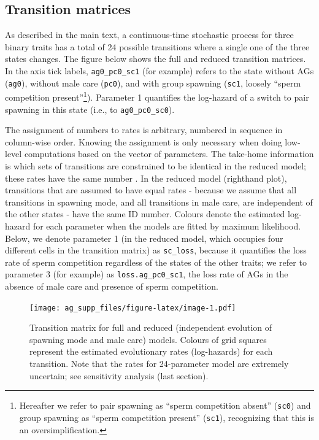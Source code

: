 \documentclass[
]{article}
\begin{document}
\hypertarget{transition-matrices}{%
\subsection{Transition matrices}\label{transition-matrices}}

As described in the main text, a continuous-time stochastic process for
three binary traits has a total of 24 possible transitions where a
single one of the three states changes. The figure below shows the full
and reduced transition matrices. In the axis tick labels,
\texttt{ag0\_pc0\_sc1} (for example) refers to the state without AGs
(\texttt{ag0}), without male care (\texttt{pc0}), and with group
spawning (\texttt{sc1}, loosely ``sperm competition
present''\footnote{Hereafter we refer to pair spawning as ``sperm
  competition absent'' (\texttt{sc0}) and group spawning as ``sperm
  competition present'' (\texttt{sc1}), recognizing that this is an
  oversimplification.}). Parameter 1 quantifies the log-hazard of a
switch to pair spawning in this state (i.e., to \texttt{ag0\_pc0\_sc0}).

The assignment of numbers to rates is arbitrary, numbered in sequence in
column-wise order. Knowing the assignment is only necessary when doing
low-level computations based on the vector of parameters. The take-home
information is which sets of transitions are constrained to be identical
in the reduced model; these rates have the same number . In the reduced
model (righthand plot), transitions that are assumed to have equal rates
- because we assume that all transitions in spawning mode, and all
transitions in male care, are independent of the other states - have the
same ID number. Colours denote the estimated log-hazard for each
parameter when the models are fitted by maximum likelihood. Below, we
denote parameter 1 (in the reduced model, which occupies four different
cells in the transition matrix) as \texttt{sc\_loss}, because it
quantifies the loss rate of sperm competition regardless of the states
of the other traits; we refer to parameter 3 (for example) as
\texttt{loss.ag\_pc0\_sc1}, the loss rate of AGs in the absence of male
care and presence of sperm competition.

\begin{figure}
\centering
\texttt{[image: ag\_supp\_files/figure-latex/image-1.pdf]}
\caption{Transition matrix for full and reduced (independent evolution
of spawning mode and male care) models. Colours of grid squares
represent the estimated evolutionary rates (log-hazards) for each
transition. Note that the rates for 24-parameter model are extremely
uncertain; see sensitivity analysis (last section).}
\end{figure}
\end{document}
